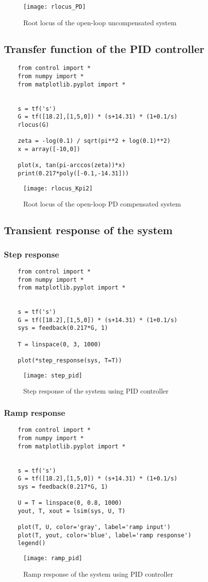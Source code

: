 \begin{figure}[ht]
	\centering
	\texttt{[image: rlocus\_PD]}
	\caption{Root locus of the open-loop uncompensated system}
\end{figure}

\subsection{Transfer function of the PID controller}
\begin{verbatim}
	from control import *
	from numpy import *
	from matplotlib.pyplot import *


	s = tf('s')
	G = tf([18.2],[1,5,0]) * (s+14.31) * (1+0.1/s)
	rlocus(G)
	
	zeta = -log(0.1) / sqrt(pi**2 + log(0.1)**2)
	x = array([-10,0])
	
	plot(x, tan(pi-arccos(zeta))*x)
	print(0.217*poly([-0.1,-14.31]))
\end{verbatim}

\begin{figure}[ht]
	\centering
	\texttt{[image: rlocus\_Kpi2]}
	\caption{Root locus of the open-loop PD compensated system}
\end{figure}

\subsection{Transient response of the system}
\subsubsection{Step response}
\begin{verbatim}
	from control import *
	from numpy import *
	from matplotlib.pyplot import *
	
	
	s = tf('s')
	G = tf([18.2],[1,5,0]) * (s+14.31) * (1+0.1/s)
	sys = feedback(0.217*G, 1)
	
	T = linspace(0, 3, 1000)
	
	plot(*step_response(sys, T=T))
\end{verbatim}

\begin{figure}[ht]
	\centering
	\texttt{[image: step\_pid]}
	\caption{Step response of the system using PID controller}
\end{figure}

\subsubsection{Ramp response}
\begin{verbatim}
	from control import *
	from numpy import *
	from matplotlib.pyplot import *
	
	
	s = tf('s')
	G = tf([18.2],[1,5,0]) * (s+14.31) * (1+0.1/s)
	sys = feedback(0.217*G, 1)
	
	U = T = linspace(0, 0.8, 1000)
	yout, T, xout = lsim(sys, U, T)
	
	plot(T, U, color='gray', label='ramp input')
	plot(T, yout, color='blue', label='ramp response')
	legend()
\end{verbatim}

\begin{figure}[ht]
	\centering
	\texttt{[image: ramp\_pid]}
	\caption{Ramp response of the system using PID controller}
\end{figure}
